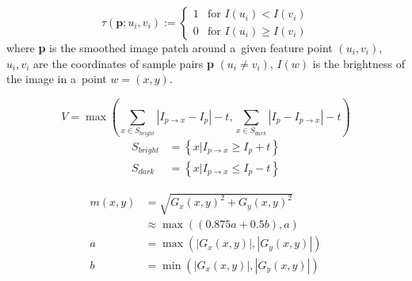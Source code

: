 \begin{equation}
\label{eq:BRIEF test}
 \tau (\textbf{p}; u_i, v_i ) := 
 \begin{cases} 
 1 & \text{for $I(u_i) < I(v_i)$} \\
 0 & \text{for $I(u_i) \ge I(v_i)$}
 \end{cases}
\end{equation}
where 
\textbf{p} is the smoothed image patch around a~given feature point $(u_i, v_i)$, 
$u_i, v_i$ are the coordinates of sample pairs \textbf{p} $(u_i \neq v_i)$, 
$I(w)$ is the brightness of the image in a~point $w = (x, y)$.


\begin{equation}
\label{eq:sum_corner_score}
V = \max \left ( \sum_{x \in S_{bright}} \left | I_{p \to x} - I_p \right | - t, \sum_{x \in S_{dark}} \left | I_{p} - I_{p \to x} \right | - t \right )
\end{equation}
\begin{equation}
\begin{aligned}
S_{bright} &= \left \{ x|I_{p \to x} \ge I_p + t \right \} \\
S_{dark} &= \left \{ x|I_{p \to x} \le I_p - t \right \}
\end{aligned}
\end{equation}

\begin{equation}\label{eq:hog_mod_amplituda_SRA}
	\begin{aligned}
		m(x,y) & = \sqrt{G_{x}(x,y)^{2} + G_{y} (x,y)^{2}} \\ & \approx \max ((0.875a + 0.5b), a) \\
		a      & = \max(\left| G_{x} (x,y)\right| ,\left| G_{y} (x,y)\right| )               \\
		b      & = \min(\left| G_{x} (x,y)\right| ,\left| G_{y} (x,y)\right| )
	\end{aligned}
\end{equation}